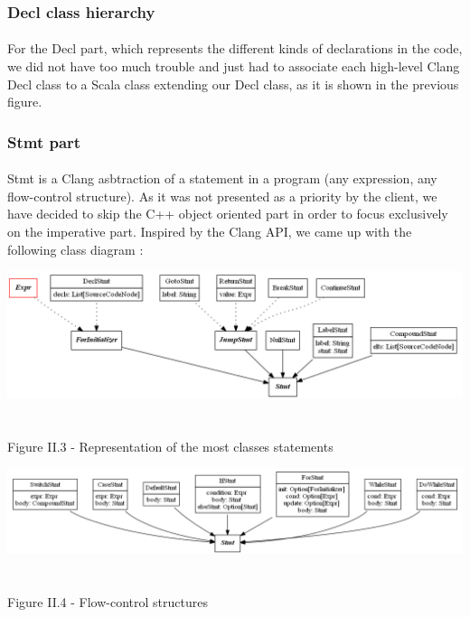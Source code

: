 \documentclass{report}
\begin{document}
\subsubsection{Decl class hierarchy}

\paragraph{}
\hspace{4mm}\textnormal{For the Decl part,  which represents the different kinds of declarations in the code, we did not have too much trouble and just had to associate each high-level Clang Decl class to a Scala class extending
our Decl class, as it is shown in the previous figure.}

\subsubsection{Stmt part}

\paragraph{}
\hspace{4mm}\textnormal{Stmt is a Clang asbtraction of a statement in a program (any expression, any flow-control structure). As it was not presented as a priority by the client, we have decided to skip the C++ object oriented 
part in order to focus exclusively on the imperative part. Inspired by the Clang API, we came up
 with the following class diagram :}

\begin{center}
\includegraphics[scale=0.4]{data/basic_Stmt_classes.png}
~\\~\\Figure II.3 - Representation of the most classes statements
\end{center}

\begin{center}
\includegraphics[scale=0.4]{data/flow_control_Stmt_classes.png}
~\\~\\Figure II.4 - Flow-control structures
\end{center}
\end{document}
